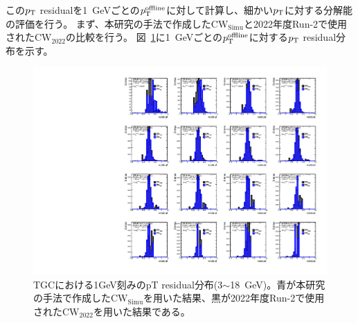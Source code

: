 この$p_{\rm{T}}$ residualを1~GeVごとの$p_{\rm{T}}^{\rm{offline}}$に対して計算し、細かい$p_{\rm{T}}$に対する分解能の評価を行う。
まず、本研究の手法で作成した$\mathrm{CW_{Simu}}$と2022年度Run-2で使用された$\mathrm{CW_{2022}}$の比較を行う。
図~\ref{residual_MC_3_18}に1~GeVごとの$p_{\rm{T}}^{\rm{offline}}$に対する$p_{\rm{T}}$ residual分布を示す。
\begin{figure}[htbp]
  \centering
  \hspace*{-1cm}
  \includegraphics[clip, width=16cm]{fig/5/residual_MC_3_18.pdf}
  \caption{TGCにおける1GeV刻みのpT residual分布(3$\sim$18~GeV)。青が本研究の手法で作成した$\mathrm{CW_{Simu}}$を用いた結果、黒が2022年度Run-2で使用された$\mathrm{CW_{2022}}$を用いた結果である。}
  \label{residual_MC_3_18}
\end{figure}

